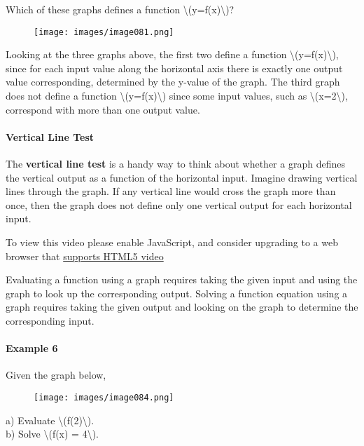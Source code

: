 Which of these graphs defines a function
\textbackslash{}(y=f(x)\textbackslash{})?

\begin{figure}
\centering
\texttt{[image: images/image081.png]}
\caption{}
\end{figure}

Looking at the three graphs above, the first two define a function
\textbackslash{}(y=f(x)\textbackslash{}), since for each input value
along the horizontal axis there is exactly one output value
corresponding, determined by the y-value of the graph. The third graph
does not define a function \textbackslash{}(y=f(x)\textbackslash{})
since some input values, such as \textbackslash{}(x=2\textbackslash{}),
correspond with more than one output value.

\hypertarget{vertical-line-test}{%
\paragraph{Vertical Line Test}\label{vertical-line-test}}

The \textbf{vertical line test} is a handy way to think about whether a
graph defines the vertical output as a function of the horizontal input.
Imagine drawing vertical lines through the graph. If any vertical line
would cross the graph more than once, then the graph does not define
only one vertical output for each horizontal input.

To view this video please enable JavaScript, and consider upgrading to a
web browser that \href{http://videojs.com/html5-video-support/}{supports
HTML5 video}

Evaluating a function using a graph requires taking the given input and
using the graph to look up the corresponding output. Solving a function
equation using a graph requires taking the given output and looking on
the graph to determine the corresponding input.

\hypertarget{example-6}{%
\paragraph{Example 6}\label{example-6}}

Given the graph below,

\begin{figure}
\centering
\texttt{[image: images/image084.png]}
\caption{}
\end{figure}

a) Evaluate \textbackslash{}(f(2)\textbackslash{}).\\
b) Solve \textbackslash{}(f(x) = 4\textbackslash{}).

